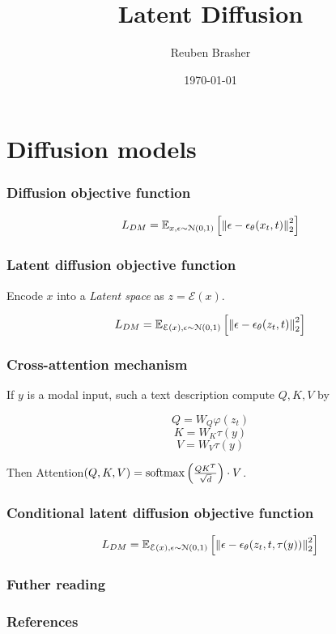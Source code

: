 \documentclass{beamer}
\title{Latent Diffusion}
\author{Reuben Brasher}
\date{\today}
\begin{document}
\frame{\titlepage}

\section[Outline]{}
\frame{\tableofcontents}

\section{Diffusion models}

\frame
{
   \frametitle{Diffusion objective function}

   $$L_{DM} = \mathbb{E}_{x,\epsilon \sim \mathcal{N}(0,1)} \left[{\left\|{\epsilon - \epsilon_\theta(x_t,t)}\right\|^2_2}\right]$$
}

\frame
{
   \frametitle{Latent diffusion objective function}

   Encode $x$ into a \textit{Latent space} as $z = \mathcal{E} (x)$.

   $$L_{DM} = \mathbb{E}_{\mathcal{E}(x),\epsilon \sim \mathcal{N}(0,1)} \left[{\left\|{\epsilon - \epsilon_\theta(z_t,t)}\right\|^2_2}\right]$$
}

\frame
{
   \frametitle{Cross-attention mechanism}

   If $y$ is a modal input, such a text description compute $Q,K,V$ by

   $$Q=W_Q \varphi(z_t)$$
   $$K=W_K \tau(y)$$
   $$V=W_V \tau(y)$$

   Then Attention$(Q,K,V)=\operatorname{softmax} \left({\frac{QK^T}{\sqrt{d}}}\right) \cdot V$.
}

\frame
{
   \frametitle{Conditional latent diffusion objective function}

   $$L_{DM} = \mathbb{E}_{\mathcal{E}(x),\epsilon \sim \mathcal{N}(0,1)} \left[{\left\|{\epsilon - \epsilon_\theta(z_t,t,\tau(y))}\right\|^2_2}\right]$$
}


\frame
{
   \frametitle{Futher reading}
   \cite{rombach2022high}
   
   \cite{zhang2023adding}
}

\begin{frame}[t,allowframebreaks]
\frametitle{References}
\printbibliography
\end{frame}
\end{document}
